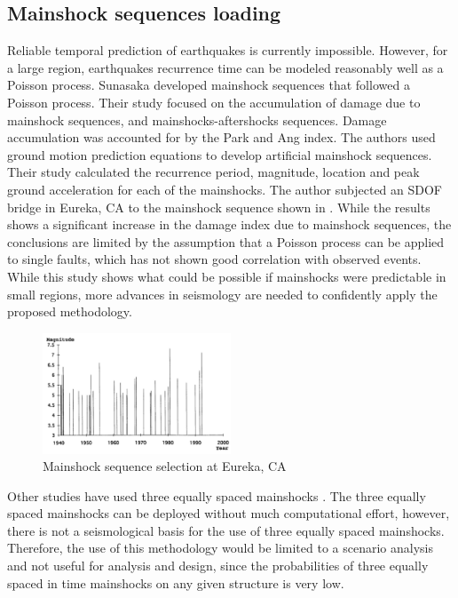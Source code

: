 \subsection{Mainshock sequences loading}

Reliable temporal prediction of earthquakes is currently impossible.  However, for a large region, earthquakes recurrence time can be modeled reasonably well as a Poisson process. Sunasaka \cite{Sunasaka1993} developed mainshock sequences that followed a Poisson process. Their study focused on the accumulation of damage due to mainshock sequences, and mainshocks-aftershocks sequences. Damage accumulation was accounted for by the Park and Ang index. The authors used ground motion prediction equations to develop artificial mainshock sequences. Their study calculated the recurrence period, magnitude, location and peak ground acceleration for each of the mainshocks. The author subjected an SDOF bridge in Eureka, CA to the mainshock sequence shown in   . While the results shows a significant increase in the damage index due to mainshock sequences, the conclusions are limited by the assumption that a Poisson process can be applied to single faults, which has not shown good correlation with observed events\cite{Shearer2009}. While this study shows what could be possible if mainshocks were predictable in small regions, more advances in seismology are needed to confidently apply the proposed methodology.

\begin{figure}[htbp]
\centering
\includegraphics[width=0.5\textwidth]{Chapter-2/figs/Mainshock_sequence_01}
\caption{Mainshock sequence selection at Eureka, CA \cite{Sunasaka1993}}
\label{fig:MS-MS_Sunasaka}
\end{figure}

Other studies have used three equally spaced mainshocks \cite{Hatzigeorgiou2009}. The three equally spaced mainshocks can be deployed without much computational effort, however, there is not a seismological basis for the use of three equally spaced mainshocks. Therefore, the use of this methodology would be limited to a scenario analysis and not useful for analysis and design, since the probabilities of three equally spaced in time mainshocks on any given structure is very low.

